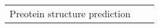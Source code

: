 \begin{center}
\begin{tabular}{l c c}
    Preotein structure prediction & 
\end{tabular}
\end{center}